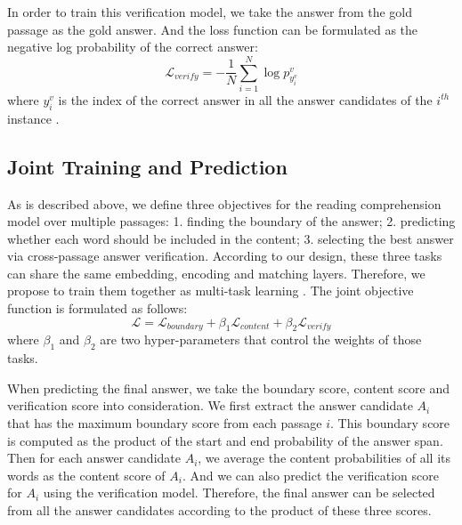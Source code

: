 In order to train this verification model, we take the answer from the gold passage as the gold answer. And the loss function can be formulated as the negative log probability of the correct answer:
\begin{equation}
	\mathcal{L}_{verify} = - \frac{1}{N} \sum_{i=1}^N \log p_{y_i^v}^{v}
\end{equation}
where $y_i^v$ is the index of the correct answer in all the answer candidates of the $i^{th}$ instance . 

\subsection{Joint Training and Prediction}
\label{train}

As is described above, we define three objectives for the reading comprehension model over multiple passages: 1. finding the boundary of the answer; 2. predicting whether each word should be included in the content; 3. selecting the best answer via cross-passage answer verification. According to our design, these three tasks can share the same embedding, encoding and matching layers. Therefore, we propose to train them together as multi-task learning \cite{multi-task}. The joint objective function is formulated as follows:
\begin{equation}
	\mathcal{L} = \mathcal{L}_{boundary} + \beta_{1} \mathcal{L}_{content} + \beta_{2} \mathcal{L}_{verify}
\end{equation}
where $\beta_1$ and $\beta_2$ are two hyper-parameters that control the weights of those tasks.

When predicting the final answer, we take the boundary score, content score and verification score into consideration. 
We first extract the answer candidate $A_i$ that has the maximum boundary score from each passage $i$. This boundary score is computed as the product of the start and end probability of the answer span. Then for each answer candidate $A_i$, we average the content probabilities of all its words as the content score of $A_i$. And we can also predict the verification score for $A_i$ using the verification model. Therefore, the final answer can be selected from all the answer candidates according to the product of these three scores. 
 